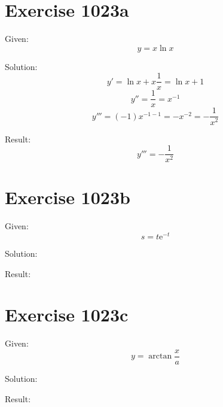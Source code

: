 \documentclass[a4paper, 10pt]{scrartcl}
\newcommand*\euler{\mathrm{e}}
\begin{document}
\section{Exercise 1023a}

Given:
\[
y = x\ln{x}
\]

Solution:
\[
y' = \ln{x} + x\frac{1}{x} = \ln{x} + 1
\]
\[
y'' = \frac{1}{x} = x^{-1}
\]
\[
y''' = (-1)x^{-1 - 1} = -x^{-2} = -\frac{1}{x^{2}}
\]

Result:
\[
y''' = -\frac{1}{x^{2}}
\]

\section{Exercise 1023b}

Given:
\[
s = t\euler^{-t}
\]

Solution:

Result:

\section{Exercise 1023c}

Given:
\[
y = \arctan{\frac{x}{a}}
\]

Solution:

Result:
\end{document}
